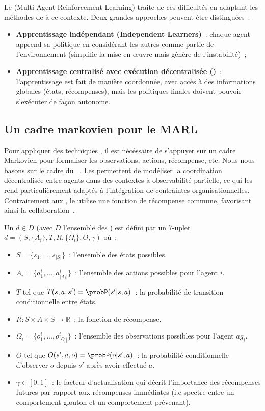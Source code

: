 Le  (Multi-Agent Reinforcement Learning) traite de ces difficultés en adaptant les méthodes de  à ce contexte. Deux grandes approches peuvent être distinguées~:
\begin{itemize}
  \item \textbf{Apprentissage indépendant (Independent Learners)}~: chaque agent apprend sa politique en considérant les autres comme partie de l'environnement (simplifie la mise en œuvre mais génère de l'instabilité)~;
  \item \textbf{Apprentissage centralisé avec exécution décentralisée ()}~: l'apprentissage est fait de manière coordonnée, avec accès à des informations globales (états, récompenses), mais les politiques finales doivent pouvoir s'exécuter de façon autonome.
\end{itemize}

\subsection{Un cadre markovien pour le MARL}

Pour appliquer des techniques , il est nécéssaire de s'appuyer sur un cadre Markovien pour formaliser les observations, actions, récompense, etc. Nous nous basons sur le cadre du ~\cite{Oliehoek2016}. Les  permettent de modéliser la coordination décentralisée entre agents dans des contextes à observabilité partielle, ce qui les rend particulièrement adaptés à l'intégration de contraintes organisationnelles. Contrairement aux , le  utilise une fonction de récompense commune, favorisant ainsi la collaboration~\cite{Beynier2013}.

Un  $d \in D$ (avec $D$ l'ensemble des ) est défini par un 7-uplet $d = (S,\{A_i\},T,R,\{\Omega_i\},O,\gamma)$ où~:
\begin{itemize}
  \item $S = \{s_1, ..., s_{|S|}\}$~: l'ensemble des états possibles.
  \item $A_i = \{a_1^i, ..., a_{|A_i|}^i\}$~: l'ensemble des actions possibles pour l'agent $i$.
  \item $T$ tel que $T(s,a,s') = \probP(s'|s,a)$~: la probabilité de transition conditionnelle entre états.
  \item $R: S \times A \times S \rightarrow \mathbb{R}$~: la fonction de récompense.
  \item $\Omega_i = \{o_1^i, ..., o_{|\Omega_i|}^i\}$~: l'ensemble des observations possibles pour l'agent $ag_i$.
  \item $O$ tel que $O(s',a,o) = \probP(o|s',a)$~: la probabilité conditionnelle d'observer $o$ depuis $s'$ après avoir effectué $a$.
  \item $\gamma \in [0,1]$~: le facteur d'actualisation qui décrit l'importance des récompenses futures par rapport aux récompenses immédiates (i.e spectre entre un comportement glouton et un comportement prévenant).
\end{itemize}

